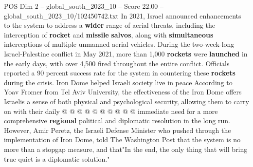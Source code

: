 \begin{textsample}{POS Dim 2 – global\_south\_2023\_10 – Score 22.00 – global\_south\_2023\_10/102450742.txt}
In 2021, Israel announced enhancements to the system to address a \textbf{wider} range of aerial threats, including the interception of \textbf{rocket} and \textbf{missile} \textbf{salvos}, along with \textbf{simultaneous} interceptions of multiple unmanned aerial vehicles.
During the two-week-long Israel-Palestine conflict in May 2021, more than 1,000 \textbf{rockets} were \textbf{launched} in the early days, with over 4,500 fired throughout the entire conflict.
Officials reported a 90 percent success rate for the system in countering these \textbf{rockets} during the crisis.
Iron Dome helped Israeli society live in peace According to Yoav Fromer from Tel Aviv University, the effectiveness of the Iron Dome offers Israelis a sense of both physical and psychological security, allowing them to carry on with their daily @ @ @ @ @ @ @ @ @ @ immediate need for a more comprehensive \textbf{regional} political and diplomatic resolution in the long run.
However, Amir Peretz, the Israeli Defense Minister who pushed through the implementation of Iron Dome, told The Washington Post that the system is no more than a stopgap measure, and that"In the end, the only thing that will bring true quiet is a diplomatic solution."

\end{textsample}
